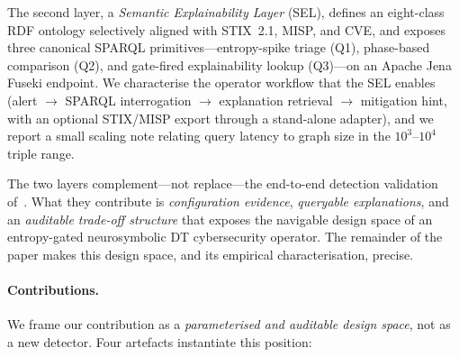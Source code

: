 \documentclass[futureinternet,article,submit,pdftex,moreauthors]{Definitions/mdpi}
\begin{document}
The second layer, a \emph{Semantic Explainability Layer} (SEL), defines
an eight-class RDF ontology selectively aligned with STIX~2.1, MISP,
and CVE, and exposes three canonical SPARQL primitives---entropy-spike
triage (Q1), phase-based comparison (Q2), and gate-fired explainability
lookup (Q3)---on an Apache Jena Fuseki endpoint. We characterise the
operator workflow that the SEL enables (alert $\to$ SPARQL
interrogation $\to$ explanation retrieval $\to$ mitigation hint, with
an optional STIX/MISP export through a stand-alone adapter), and we
report a small scaling note relating query latency to graph size in the
$10^{3}$--$10^{4}$ triple range.

The two layers complement---not replace---the end-to-end detection
validation of~\cite{paper3}. What they contribute is
\emph{configuration evidence}, \emph{queryable explanations}, and an
\emph{auditable trade-off structure} that exposes the navigable design
space of an entropy-gated neurosymbolic DT cybersecurity operator. The
remainder of the paper makes this design space, and its empirical
characterisation, precise.

\paragraph{Contributions.} We frame our contribution as a
\emph{parameterised and auditable design space}, not as a new detector.
Four artefacts instantiate this position:
\end{document}
